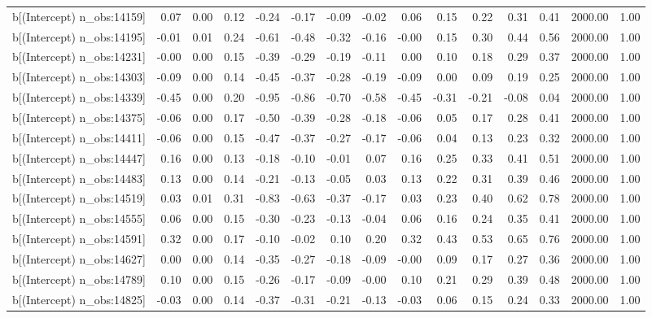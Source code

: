 \begin{table}[ht]
\begin{tabular}{rrrrrrrrrrrrrrr}
  b[(Intercept) n\_obs:14159] & 0.07 & 0.00 & 0.12 & -0.24 & -0.17 & -0.09 & -0.02 & 0.06 & 0.15 & 0.22 & 0.31 & 0.41 & 2000.00 & 1.00 \\ 
  b[(Intercept) n\_obs:14195] & -0.01 & 0.01 & 0.24 & -0.61 & -0.48 & -0.32 & -0.16 & -0.00 & 0.15 & 0.30 & 0.44 & 0.56 & 2000.00 & 1.00 \\ 
  b[(Intercept) n\_obs:14231] & -0.00 & 0.00 & 0.15 & -0.39 & -0.29 & -0.19 & -0.11 & 0.00 & 0.10 & 0.18 & 0.29 & 0.37 & 2000.00 & 1.00 \\ 
  b[(Intercept) n\_obs:14303] & -0.09 & 0.00 & 0.14 & -0.45 & -0.37 & -0.28 & -0.19 & -0.09 & 0.00 & 0.09 & 0.19 & 0.25 & 2000.00 & 1.00 \\ 
  b[(Intercept) n\_obs:14339] & -0.45 & 0.00 & 0.20 & -0.95 & -0.86 & -0.70 & -0.58 & -0.45 & -0.31 & -0.21 & -0.08 & 0.04 & 2000.00 & 1.00 \\ 
  b[(Intercept) n\_obs:14375] & -0.06 & 0.00 & 0.17 & -0.50 & -0.39 & -0.28 & -0.18 & -0.06 & 0.05 & 0.17 & 0.28 & 0.41 & 2000.00 & 1.00 \\ 
  b[(Intercept) n\_obs:14411] & -0.06 & 0.00 & 0.15 & -0.47 & -0.37 & -0.27 & -0.17 & -0.06 & 0.04 & 0.13 & 0.23 & 0.32 & 2000.00 & 1.00 \\ 
  b[(Intercept) n\_obs:14447] & 0.16 & 0.00 & 0.13 & -0.18 & -0.10 & -0.01 & 0.07 & 0.16 & 0.25 & 0.33 & 0.41 & 0.51 & 2000.00 & 1.00 \\ 
  b[(Intercept) n\_obs:14483] & 0.13 & 0.00 & 0.14 & -0.21 & -0.13 & -0.05 & 0.03 & 0.13 & 0.22 & 0.31 & 0.39 & 0.46 & 2000.00 & 1.00 \\ 
  b[(Intercept) n\_obs:14519] & 0.03 & 0.01 & 0.31 & -0.83 & -0.63 & -0.37 & -0.17 & 0.03 & 0.23 & 0.40 & 0.62 & 0.78 & 2000.00 & 1.00 \\ 
  b[(Intercept) n\_obs:14555] & 0.06 & 0.00 & 0.15 & -0.30 & -0.23 & -0.13 & -0.04 & 0.06 & 0.16 & 0.24 & 0.35 & 0.41 & 2000.00 & 1.00 \\ 
  b[(Intercept) n\_obs:14591] & 0.32 & 0.00 & 0.17 & -0.10 & -0.02 & 0.10 & 0.20 & 0.32 & 0.43 & 0.53 & 0.65 & 0.76 & 2000.00 & 1.00 \\ 
  b[(Intercept) n\_obs:14627] & 0.00 & 0.00 & 0.14 & -0.35 & -0.27 & -0.18 & -0.09 & -0.00 & 0.09 & 0.17 & 0.27 & 0.36 & 2000.00 & 1.00 \\ 
  b[(Intercept) n\_obs:14789] & 0.10 & 0.00 & 0.15 & -0.26 & -0.17 & -0.09 & -0.00 & 0.10 & 0.21 & 0.29 & 0.39 & 0.48 & 2000.00 & 1.00 \\ 
  b[(Intercept) n\_obs:14825] & -0.03 & 0.00 & 0.14 & -0.37 & -0.31 & -0.21 & -0.13 & -0.03 & 0.06 & 0.15 & 0.24 & 0.33 & 2000.00 & 1.00 \\ 

\end{tabular}
\end{table}
